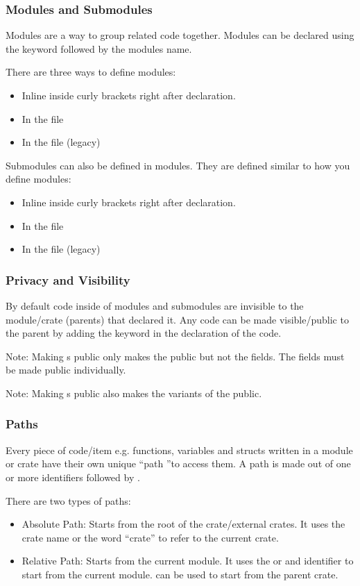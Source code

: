 \documentclass{beamer}
\begin{document}
\begin{frame}
  \frametitle{Modules and Submodules}
  Modules are a way to group related code together. Modules can be declared using the  keyword followed by the modules name.

  There are three ways to define modules:
  \begin{itemize}
    \item Inline inside curly brackets right after declaration.
    \item In the file 
    \item In the file  (legacy)
  \end{itemize}

  Submodules can also be defined in modules. They are defined similar to how you define modules:
  \begin{itemize}
    \item Inline inside curly brackets right after declaration.
    \item In the file 
    \item In the file  (legacy)
  \end{itemize}
\end{frame}

\begin{frame}
  \frametitle{Privacy and Visibility}
  By default code inside of modules and submodules are invisible to the module/crate (parents) that declared it. Any code can be made visible/public to the parent by adding the  keyword in the declaration of the code.

  

  \alert{Note}: Making s public only makes the  public but not the fields. The fields must be made public individually.

  \alert{Note}: Making s public also makes the variants of the  public.
\end{frame}

\begin{frame}
  \frametitle{Paths}
  Every piece of code/item e.g. functions, variables and structs written in a module or crate have their own unique ``path ''to access them.
  A path is made out of one or more identifiers followed by \inlinecode{::}.

  There are two types of paths:
  \begin{itemize}
    \item{Absolute Path: Starts from the root of the crate/external crates. It uses the crate name or the word ``crate'' to refer to the current crate.}
    \item{Relative Path: Starts from the current module. It uses the  or and identifier to start from the current module.  can be used to start from the parent crate.}
  \end{itemize}
\end{frame}
\end{document}
